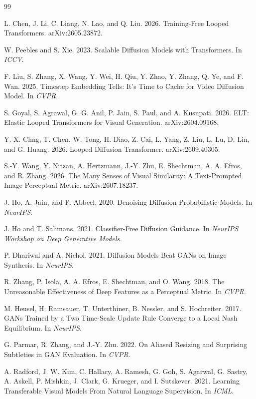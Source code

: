 \documentclass[sigconf,nonacm]{acmart}
\begin{document}

\begin{thebibliography}{99}

L. Chen, J. Li, C. Liang, N. Lao, and Q. Liu. 2026. Training-Free Looped Transformers.
arXiv:2605.23872.

W. Peebles and S. Xie. 2023. Scalable Diffusion Models with Transformers. In \emph{ICCV}.

F. Liu, S. Zhang, X. Wang, Y. Wei, H. Qiu, Y. Zhao, Y. Zhang, Q. Ye, and F. Wan. 2025.
Timestep Embedding Tells: It's Time to Cache for Video Diffusion Model. In \emph{CVPR}.

S. Goyal, S. Agrawal, G. G. Anil, P. Jain, S. Paul, and A. Kusupati. 2026. ELT: Elastic
Looped Transformers for Visual Generation. arXiv:2604.09168.

Y. X. Chng, T. Chen, W. Tong, H. Diao, Z. Cai, L. Yang, Z. Liu, L. Lu, D. Lin, and
G. Huang. 2026. Looped Diffusion Transformer. arXiv:2609.40305.

S.-Y. Wang, Y. Nitzan, A. Hertzmann, J.-Y. Zhu, E. Shechtman, A. A. Efros, and R. Zhang.
2026. The Many Senses of Visual Similarity: A Text-Prompted Image Perceptual Metric.
arXiv:2607.18237.

J. Ho, A. Jain, and P. Abbeel. 2020. Denoising Diffusion Probabilistic Models. In
\emph{NeurIPS}.

J. Ho and T. Salimans. 2021. Classifier-Free Diffusion Guidance. In \emph{NeurIPS
Workshop on Deep Generative Models}.

P. Dhariwal and A. Nichol. 2021. Diffusion Models Beat GANs on Image Synthesis. In
\emph{NeurIPS}.

R. Zhang, P. Isola, A. A. Efros, E. Shechtman, and O. Wang. 2018. The Unreasonable
Effectiveness of Deep Features as a Perceptual Metric. In \emph{CVPR}.

M. Heusel, H. Ramsauer, T. Unterthiner, B. Nessler, and S. Hochreiter. 2017. GANs Trained
by a Two Time-Scale Update Rule Converge to a Local Nash Equilibrium. In \emph{NeurIPS}.

G. Parmar, R. Zhang, and J.-Y. Zhu. 2022. On Aliased Resizing and Surprising Subtleties
in GAN Evaluation. In \emph{CVPR}.

A. Radford, J. W. Kim, C. Hallacy, A. Ramesh, G. Goh, S. Agarwal, G. Sastry, A. Askell,
P. Mishkin, J. Clark, G. Krueger, and I. Sutskever. 2021. Learning Transferable Visual
Models From Natural Language Supervision. In \emph{ICML}.

\end{thebibliography}
\end{document}
